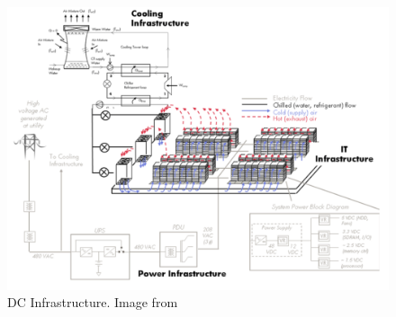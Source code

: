 \begin{figure} [!h]
\centering
\includegraphics[scale=.25]{methodology/images/dc_cooling.png}
\caption[DC Infrastructure]{DC Infrastructure.  Image from \cite{shah11}}
\label{img_dc_infrastructure}
\end{figure}